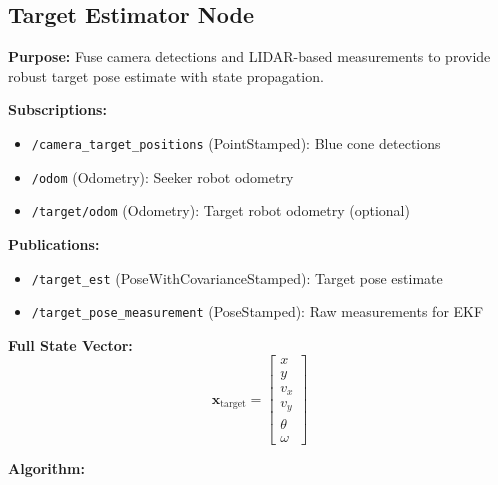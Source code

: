 \documentclass[11pt]{article}
\begin{document}
\subsection{Target Estimator Node}

\textbf{Purpose:} Fuse camera detections and LIDAR-based measurements to provide robust target pose estimate with state propagation.

\textbf{Subscriptions:}
\begin{itemize}
    \item \texttt{/camera\_target\_positions} (PointStamped): Blue cone detections
    \item \texttt{/odom} (Odometry): Seeker robot odometry
    \item \texttt{/target/odom} (Odometry): Target robot odometry (optional)
\end{itemize}

\textbf{Publications:}
\begin{itemize}
    \item \texttt{/target\_est} (PoseWithCovarianceStamped): Target pose estimate
    \item \texttt{/target\_pose\_measurement} (PoseStamped): Raw measurements for EKF
\end{itemize}

\textbf{Full State Vector:}
\[
\mathbf{x}_{\text{target}} = \begin{bmatrix} x \\ y \\ v_x \\ v_y \\ \theta \\ \omega \end{bmatrix}
\]

\textbf{Algorithm:}
\end{document}
